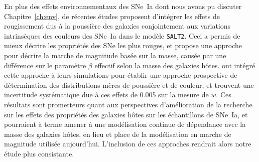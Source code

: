 \documentclass[../main/main.tex]{subfiles}
\begin{document}
En plus des effets environnementaux des SNe~Ia dont nous avons pu discuter
Chapitre~\ref{ch:env}, de récentes études \citep{brout2021} proposent
d'intégrer les effets de rougissement dus à la poussière des galaxies
conjointement aux variations intrinsèques des couleurs des SNe~Ia dans le modèle
\texttt{SALT2}. Ceci a permis de mieux décrire les propriétés des SNe les plus
rouges, et propose une approche pour décrire la marche de magnitude basée sur la
masse, causée par une différence sur le paramètre $\beta$ effectif selon la
masse des galaxies hôtes. \cite{popovic2021b} ont intégré cette approche à leurs
simulations pour établir une approche prospective de détermination des
distributions mères de poussière et de couleur, et trouvent une incertitude
systématique due à ces effets de \num{0.005} sur la mesure de $w$. Ces résultats
sont prometteurs quant aux perspectives d'amélioration de la recherche sur les
effets des propriétés des galaxies hôtes sur les échantillons de SNe~Ia, et
pourraient à terme amener à une modélisation continue de dépendance avec la
masse des galaxies hôtes, en lieu et place de la modélisation en marche de
magnitude utilisée aujourd'hui. L'inclusion de ces approches rendrait alors
notre étude plus consistante.

\clearpage

\thispagestyle{plain}
\vspace*{\fill}
\minilof
\vspace*{\fill}
\minilot
\vspace*{\fill}

% 
% 
\end{document}
